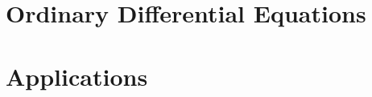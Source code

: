 \documentclass[12pt]{article} %
\begin{document}
    \section{Ordinary Differential Equations}
    

    \section{Applications}
    
    
    
    
    
    
\end{document}
